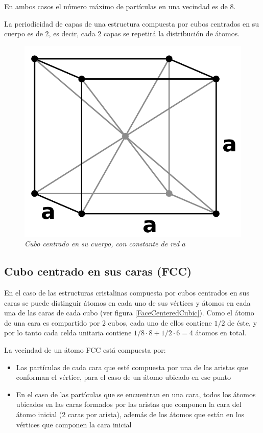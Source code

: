 En ambos casos el número máximo de partículas en una vecindad es de 8.

La periodicidad de capas de una estructura compuesta por cubos centrados en su cuerpo es de 2, es decir, cada 2 capas se repetirá la distribución de átomos.

\begin{figure}[ht]
  \centering
  \includegraphics[scale=.6]{images/BodyCenteredCubic}
  \caption{\em Cubo centrado en su cuerpo, con constante de red $a$}
  \label{BodyCenteredCubic}
\end{figure}


\subsection{Cubo centrado en sus caras (FCC)}
En el caso de las estructuras cristalinas compuesta por cubos centrados en sus caras se puede distinguir átomos en cada uno de sus vértices y átomos en cada una de las caras de cada cubo (ver figura \ref{FaceCenteredCubic}). Como el átomo de una cara es compartido por 2 cubos, cada uno de ellos contiene $1/2$ de éste, y por lo tanto cada celda unitaria contiene $1/8 \cdot 8 + 1/2 \cdot 6 = 4$ átomos en total.

La vecindad de un átomo FCC está compuesta por:

\begin{itemize}
  \item Las partículas de cada cara que esté compuesta por una de las aristas que conforman el vértice, para el caso de un átomo ubicado en ese punto
  \item En el caso de las partículas que se encuentran en una cara, todos los átomos ubicados en las caras formados por las aristas que componen la cara del átomo inicial (2 caras por arista), además de los átomos que están en los vértices que componen la cara inicial
\end{itemize}

